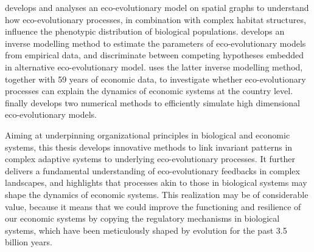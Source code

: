 \Cref{\chapi} develops and analyses an eco-evolutionary model on spatial graphs to understand how eco-evolutionary processes, in combination with complex habitat structures, influence the phenotypic distribution of biological populations. \Cref{\chapii} develops an inverse modelling method to estimate the parameters of eco-evolutionary models from empirical data, and discriminate between competing hypotheses embedded in alternative eco-evolutionary model. \Cref{\chapiv} uses the latter inverse modelling method, together with 59 years of economic data, to investigate whether eco-evolutionary processes can explain the dynamics of economic systems at the country level. \Cref{\chapiv} finally develops two numerical methods to efficiently simulate high dimensional eco-evolutionary models.

Aiming at underpinning organizational principles in biological and economic systems, this thesis develops innovative methods to link invariant patterns in complex adaptive systems to underlying eco-evolutionary processes. It further delivers a fundamental understanding of eco-evolutionary feedbacks in complex landscapes, and highlights that processes akin to those in biological systems may shape the dynamics of economic systems. This realization may be of considerable value, because it means that we could improve the functioning and resilience of our economic systems by copying the regulatory mechanisms in biological systems, which have been meticulously shaped by evolution for the past 3.5 billion years. 















